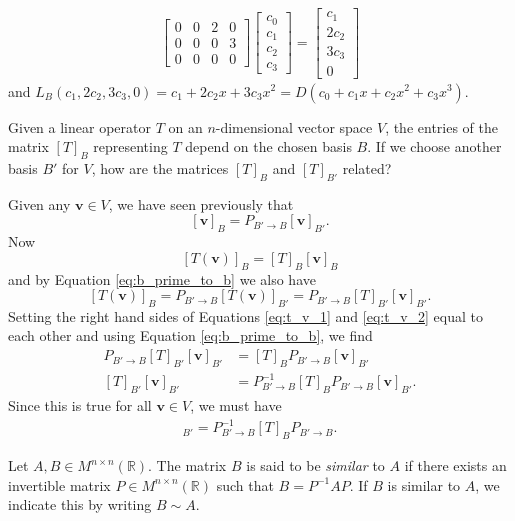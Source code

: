 \documentclass[12pt,letterpaper,reqno]{article}
\numberwithin{equation}{section}
\newcommand{\R}{\ensuremath{\mathbb R}}
\newcommand{\bv}{\mathbf{v}}
\begin{document}
\begin{example}
\begin{align*}
\begin{bmatrix}
			0 & 0 & 2 & 0 \\
			0 & 0 & 0 & 3 \\
			0 & 0 & 0 & 0
		\end{bmatrix}\begin{bmatrix}
			c_0 \\ c_1 \\ c_2 \\ c_3
		\end{bmatrix}=\begin{bmatrix}
			c_1 \\ 2c_2 \\ 3c_3 \\ 0
		\end{bmatrix}
	\end{align*}
	and $L_B(c_1,2c_2,3c_3,0)=c_1+2c_2x+3c_3x^2=D(c_0+c_1x+c_2x^2+c_3x^3)$.
\end{example}
Given a linear operator $T$ on an $n$-dimensional vector space $V$, the entries of the matrix $[T]_B$ representing $T$ depend on the chosen basis $B$. If we choose another basis $B'$ for $V$, how are the matrices $[T]_B$ and $[T]_{B'}$ related? 

Given any $\bv \in V$, we have seen previously that 
\begin{equation}\label{eq:b_prime_to_b}
	[\bv]_B=P_{B' \to B}[\bv]_{B'}.
\end{equation}
Now 
\begin{equation}\label{eq:t_v_1}
	[T(\bv)]_B=[T]_B[\bv]_B
\end{equation}
and by Equation \eqref{eq:b_prime_to_b} we also have
\begin{equation}\label{eq:t_v_2}
	[T(\bv)]_B=P_{B' \to B}[T(\bv)]_{B'}=P_{B' \to B}[T]_{B'}[\bv]_{B'}.
\end{equation}
Setting the right hand sides of Equations \eqref{eq:t_v_1} and \eqref{eq:t_v_2} equal to each other and using Equation \eqref{eq:b_prime_to_b}, we find
\begin{align*}
	P_{B' \to B}[T]_{B'}[\bv]_{B'}&=[T]_BP_{B' \to B}[\bv]_{B'} \\
	[T]_{B'}[\bv]_{B'}&=P_{B' \to B}^{-1}[T]_BP_{B' \to B}[\bv]_{B'}.
\end{align*}
Since this is true for all $\bv \in V$, we must have
\begin{align*}
	[T]_{B'}=P^{-1}_{B' \to B}[T]_BP_{B' \to B}.
\end{align*}

\begin{defn}
Let $A,B \in M^{n \times n}(\R)$. The matrix $B$ is said to be \emph{similar} to $A$ if there exists an invertible matrix $P \in M^{n \times n}(\R)$ such that $B=P^{-1}AP$. If $B$ is similar to $A$, we indicate this by writing $B \sim A$.	
\end{defn}
\end{document}

